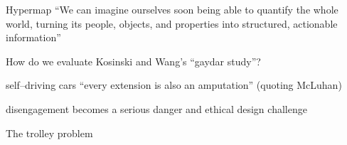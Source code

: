 \documentclass[presentation]{subfiles}
\begin{document}
\begin{frame}{Hypermap}
``We can imagine ourselves soon being able to quantify the whole world, turning its people, objects, and properties into structured, actionable information''

How do we evaluate Kosinski and Wang's ``gaydar study''?
\end{frame}

\begin{frame}{self--driving cars}
``every extension is also an amputation'' (quoting McLuhan)

\alert{disengagement} becomes a serious danger and ethical design challenge

\end{frame}

\begin{frame}[t]{The trolley problem }
  
  {\centering

  
  }


\end{frame}
\end{document}
